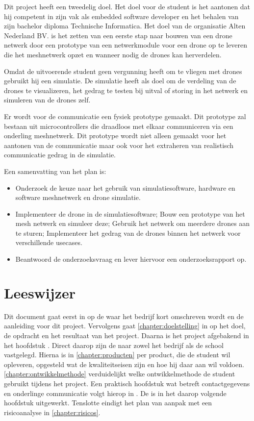 \documentclass[a4paper, 11pt, oneside]{report}
\begin{document}
Dit project heeft een tweedelig doel.
Het doel voor de student is het aantonen dat hij competent in zijn vak als embedded software developer en het behalen van zijn bachelor diploma Technische Informatica.
Het doel van de organisatie Alten Nederland BV. is het zetten van een eerste stap naar bouwen van een drone netwerk door een prototype van een netwerkmodule voor een drone op te leveren die het meshnetwerk opzet en wanneer nodig de drones kan herverdelen.

Omdat de uitvoerende student geen vergunning heeft om te vliegen met drones gebruikt hij een simulatie.
De simulatie heeft als doel om de verdeling van de drones te visualizeren, het gedrag te testen bij uitval of storing in het netwerk en simuleren van de drones zelf.

Er wordt voor de communicatie een fysiek prototype gemaakt.
Dit prototype zal bestaan uit microcontrollers die draadloos met elkaar communiceren via een onderling meshnetwerk. 
Dit prototype wordt niet alleen gemaakt voor het aantonen van de communicatie maar ook voor het extraheren van realistisch communicatie gedrag in de simulatie.

Een samenvatting van het plan is:

\begin{itemize}
	\item Onderzoek de keuze naar het gebruik van simulatiesoftware, hardware en software meshnetwerk en drone simulatie.
	\item Implementeer de drone in de simulatiesoftware; Bouw een prototype van het mesh netwerk en simuleer deze; Gebruik het netwerk om meerdere drones aan te sturen; Implementeer het gedrag van de drones binnen het netwerk voor verschillende usecases. %
	\item Beantwoord de onderzoeksvraag en lever hiervoor een onderzoeksrapport op.
\end{itemize}

\section{Leeswijzer}

Dit document gaat eerst in op de  waar het bedrijf kort omschreven wordt en de aanleiding voor dit project.
Vervolgens gaat \autoref{chapter:doelstelling} in op het doel, de opdracht en het resultaat van het project.
Daarna is het project afgebakend in het hoofdstuk .
Direct daarop zijn de  naar zowel het bedrijf als de school vastgelegd.
Hierna is in \autoref{chapter:producten} per product, die de student wil opleveren, opgesteld wat de kwaliteitseisen zijn en hoe hij daar aan wil voldoen.
\autoref{chapter:ontwikkelmethode} verduidelijkt welke ontwikkelmethode de student gebruikt tijdens het project.
Een praktisch hoofdstuk wat betreft contactgegevens en onderlinge communicatie volgt hierop in .
De  is in het daarop volgende hoofdstuk uitgewerkt.
Tenslotte eindigt het plan van aanpak met een risicoanalyse in \autoref{chapter:risicos}.
\end{document}
